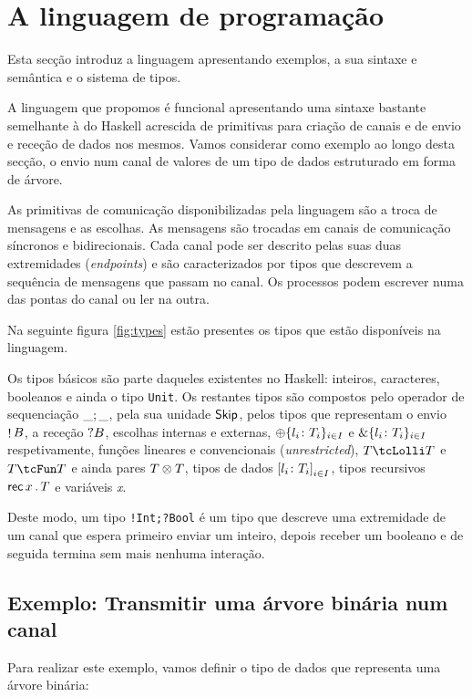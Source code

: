 \section{A linguagem de programação}
\lstset{language=CFST, style=eclipse}

Esta secção introduz a linguagem apresentando exemplos, a sua sintaxe e semântica e o sistema de tipos. 

A linguagem que propomos é funcional apresentando uma sintaxe bastante semelhante à do Haskell acrescida de primitivas para criação de canais e de envio e receção de dados nos mesmos. Vamos considerar como exemplo ao longo desta secção, o envio num canal de valores de um tipo de dados estruturado em forma de árvore.

As primitivas de comunicação disponibilizadas pela linguagem são a troca de mensagens e as escolhas. As mensagens são trocadas em canais de comunicação síncronos e bidirecionais. Cada canal pode ser descrito pelas suas duas extremidades (\textit{endpoints}) e são caracterizados por tipos que descrevem a sequência de mensagens que passam no canal.
Os processos podem escrever numa das pontas do canal ou ler na outra.

Na seguinte figura \ref{fig:types} estão presentes os tipos que estão disponíveis na linguagem.



Os tipos básicos são parte daqueles existentes no Haskell: inteiros, caracteres, booleanos e ainda o tipo \lstinline"Unit". Os restantes tipos são compostos pelo operador de sequenciação $\_;\_$, pela sua unidade $\mathsf{Skip}$, pelos tipos que representam o envio $\mathop! B$, a receção $?B$, escolhas internas e externas, $\oplus\{l_i\colon T_i\}_{i\in I}$ e $\&\{l_i\colon T_i\}_{i\in I}$ respetivamente, funções lineares e convencionais (\textit{unrestricted}), $\tLinFun{T}{T}$ e $\tUnFun{T}{T}$ e ainda pares $T\otimes T$, tipos de dados ${[l_i\colon T_i]}_{i\in I}$, tipos recursivos $\mathsf{rec}\,x\,.\,T$ e variáveis \textit{x}.

Deste modo, um tipo \lstinline"!Int;?Bool" é um tipo que descreve uma extremidade de um canal que espera primeiro enviar um inteiro, depois receber um booleano e de seguida termina sem mais nenhuma interação.

\subsection{Exemplo: Transmitir uma árvore binária num canal}
\label{sec:example}
Para realizar este exemplo, vamos definir o tipo de dados que representa uma árvore binária:


